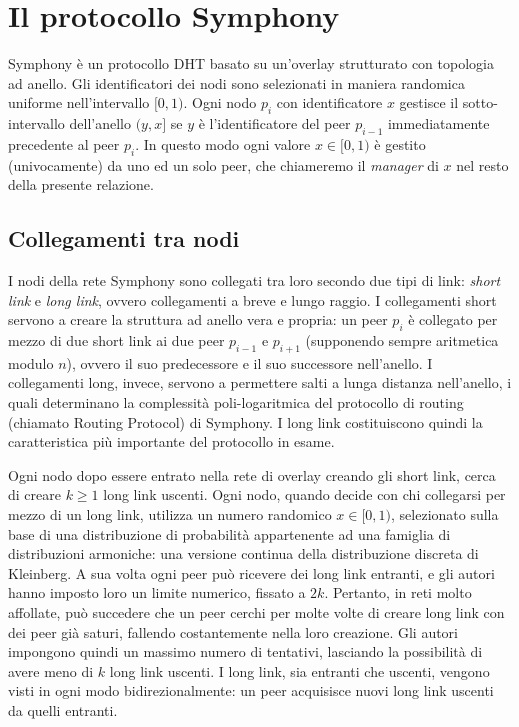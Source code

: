 \documentclass[prodmode,acmtap]{acmlarge}
\begin{document}
\section{Il protocollo Symphony} \label{symphony}
Symphony è un protocollo DHT basato su un'overlay strutturato con topologia ad anello. Gli identificatori dei nodi sono selezionati in maniera randomica uniforme nell'intervallo $[0,1)$. Ogni nodo $p_i$ con identificatore $x$ gestisce il sotto-intervallo dell'anello $(y,x]$ se $y$ è l'identificatore del peer $p_{i-1}$ immediatamente precedente al peer $p_i$. In questo modo ogni valore $x \in [0,1)$ è gestito (univocamente) da uno ed un solo peer, che chiameremo il \emph{manager} di $x$ nel resto della presente relazione.

\subsection{Collegamenti tra nodi}
I nodi della rete Symphony sono collegati tra loro secondo due tipi di link: \emph{short link} e \emph{long link}, ovvero collegamenti a breve e lungo raggio. I collegamenti short servono a creare la struttura ad anello vera e propria: un peer $p_i$ è collegato per mezzo di due short link ai due peer $p_{i-1}$ e $p_{i+1}$ (supponendo sempre aritmetica modulo $n$), ovvero il suo predecessore e il suo successore nell'anello. I collegamenti long, invece, servono a permettere salti a lunga distanza nell'anello, i quali determinano la complessità poli-logaritmica del protocollo di routing (chiamato Routing Protocol) di Symphony. I long link costituiscono quindi la caratteristica più importante del protocollo in esame.

Ogni nodo dopo essere entrato nella rete di overlay creando gli short link, cerca di creare $k \ge 1$ long link uscenti. Ogni nodo, quando decide con chi collegarsi per mezzo di un long link, utilizza un numero randomico $x \in [0,1)$, selezionato sulla base di una distribuzione di probabilità appartenente ad una famiglia di distribuzioni armoniche: una versione continua della distribuzione discreta di Kleinberg. A sua volta ogni peer può ricevere dei long link entranti, e gli autori hanno imposto loro un limite numerico, fissato a $2k$. Pertanto, in reti molto affollate, può succedere che un peer cerchi per molte volte di creare long link con dei peer già saturi, fallendo costantemente nella loro creazione. Gli autori impongono quindi un massimo numero di tentativi, lasciando la possibilità di avere meno di $k$ long link uscenti. I long link, sia entranti che uscenti, vengono visti in ogni modo bidirezionalmente: un peer acquisisce nuovi long link uscenti da quelli entranti.
\end{document}
